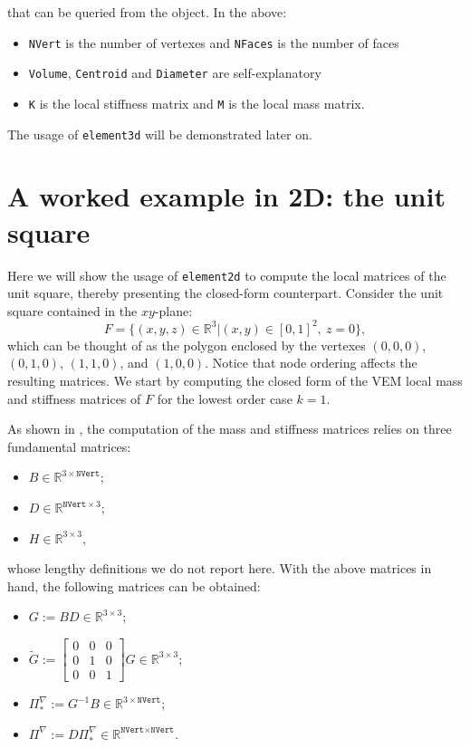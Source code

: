 \documentclass[a4paper]{article}
\begin{document}
\noindent
that can be queried from the object. In the above:
\begin{itemize}
\item \texttt{NVert} is the number of vertexes and \texttt{NFaces} is the number of faces
\item \texttt{Volume}, \texttt{Centroid} and \texttt{Diameter} are self-explanatory
\item \texttt{K} is the local stiffness matrix and \texttt{M} is the local mass matrix.
\end{itemize}

\noindent
The usage of \texttt{element3d} will be demonstrated later on.

\section{A worked example in 2D: the unit square}
Here we will show the usage of \texttt{element2d} to compute the local matrices of the unit square, thereby presenting the closed-form counterpart. Consider the unit square contained in the $xy$-plane:
\begin{equation}
F = \{(x,y,z) \in \mathbb{R}^3 | (x,y) \in [0,1]^2, \ z = 0\},
\end{equation}
which can be thought of as the polygon enclosed by the vertexes $(0, 0, 0)$, $(0, 1, 0)$, $(1,1, 0)$, and $(1, 0, 0)$.  Notice that node ordering affects the resulting matrices.  We start by computing the closed form of the VEM local mass and stiffness matrices of $F$ for the lowest order case $k=1$.

\noindent
As shown in \cite{hitchhikers}, the computation of the mass and stiffness matrices relies on three fundamental matrices:
\begin{itemize}
\item $B \in \mathbb{R}^{3\times\texttt{NVert}}$;
\item $D \in \mathbb{R}^{\texttt{NVert} \times 3}$;
\item $H \in\mathbb{R}^{3\times 3}$,
\end{itemize}
whose lengthy definitions we do not report here. With the above matrices in hand, the following matrices can be obtained:
\begin{itemize}
\item $G := BD \in\mathbb{R}^{3\times 3}$;
\item $\widetilde{G} := \left[\begin{array}{ccc}
0 & 0 & 0\\ 0 & 1 & 0 \\ 0 & 0 & 1
\end{array}\right] G \in\mathbb{R}^{3\times 3}$;
\item $\Pi^\nabla_* := G^{-1}B \in \mathbb{R}^{3\times\texttt{NVert}}$;
\item $\Pi^\nabla := D\Pi^\nabla_* \in \mathbb{R}^{\texttt{NVert}\times\texttt{NVert}}$.
\end{itemize}
\end{document}
